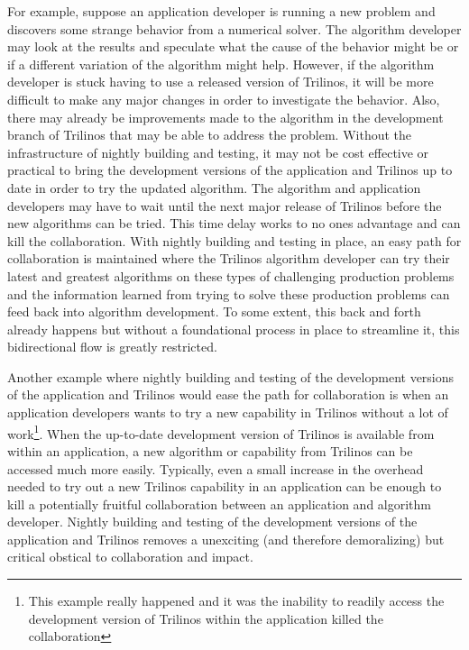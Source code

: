 \documentclass[pdf,ps2pdf,11pt]{SANDreport}
\begin{document}
For example, suppose an application developer is running a new problem and
discovers some strange behavior from a numerical solver.  The algorithm
developer may look at the results and speculate what the cause of the behavior
might be or if a different variation of the algorithm might help.
However, if the algorithm developer is stuck having to use a released version
of Trilinos, it will be more difficult to make any major changes in order to
investigate the behavior.  Also, there may already be improvements made to the
algorithm in the development branch of Trilinos that may be able to address
the problem.  Without the infrastructure of nightly building and testing, it
may not be cost effective or practical to bring the development versions of
the application and Trilinos up to date in order to try the updated algorithm.
The algorithm and application developers may have to wait until the next major
release of Trilinos before the new algorithms can be tried.  This time delay
works to no ones advantage and can kill the collaboration.  With nightly
building and testing in place, an easy path for collaboration is maintained
where the Trilinos algorithm developer can try their latest and greatest
algorithms on these types of challenging production problems and the
information learned from trying to solve these production problems can feed
back into algorithm development.  To some extent, this back and forth already
happens but without a foundational process in place to streamline it, this
bidirectional flow is greatly restricted.

Another example where nightly building and testing of the development versions
of the application and Trilinos would ease the path for collaboration is when
an application developers wants to try a new capability in Trilinos without a
lot of work\footnote{This example really happened and it was the inability to
readily access the development version of Trilinos within the application
killed the collaboration}.  When the up-to-date development version of
Trilinos is available from within an application, a new algorithm or
capability from Trilinos can be accessed much more easily.  Typically, even a
small increase in the overhead needed to try out a new Trilinos capability in
an application can be enough to kill a potentially fruitful collaboration
between an application and algorithm developer.  Nightly building and testing
of the development versions of the application and Trilinos removes a
unexciting (and therefore demoralizing) but critical obstical to collaboration
and impact.
\end{document}
